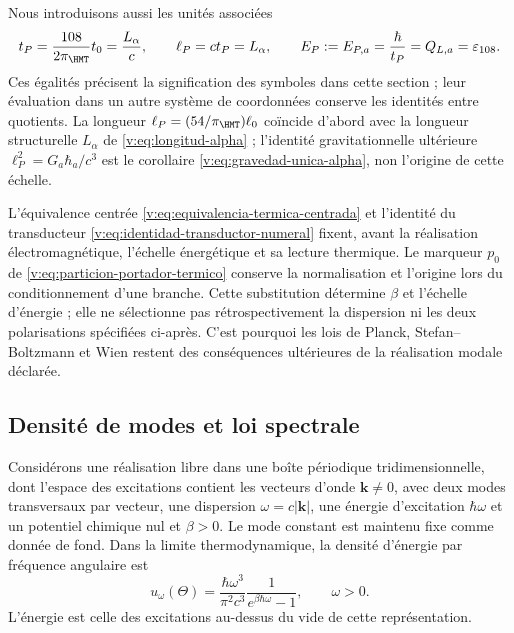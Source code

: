 Nous introduisons aussi les unités associées
\begin{equation}
 t_P=\frac{108}{2\pi_{\HMT}}t_0=\frac{L_\alpha}{c},\qquad
 \ell_P=ct_P=L_\alpha,\qquad
 E_P:=E_{P,a}=\frac{\hbar}{t_P}=Q_{L,a}=\varepsilon_{108}.
 \label{v:eq:unidades-termicas-calendario}
\end{equation}
Ces égalités précisent la signification des symboles dans cette section ;
leur évaluation dans un autre système de coordonnées conserve les identités entre quotients.
La longueur \(\ell_P=(54/\pi_{\HMT})\ell_0\) coïncide d’abord avec
la longueur structurelle \(L_\alpha\) de
\eqref{v:eq:longitud-alpha} ; l’identité gravitationnelle ultérieure
\(\ell_P^2=G_a\hbar_a/c^3\) est le corollaire
\eqref{v:eq:gravedad-unica-alpha}, non l’origine de cette échelle.

L’équivalence centrée
\eqref{v:eq:equivalencia-termica-centrada} et l’identité du transducteur
\eqref{v:eq:identidad-transductor-numeral} fixent, avant la réalisation
électromagnétique, l’échelle énergétique et sa lecture thermique. Le marqueur
$p_0$ de \eqref{v:eq:particion-portador-termico} conserve la normalisation
et l’origine lors du conditionnement d’une branche. Cette substitution détermine $\beta$ et
l’échelle d’énergie ; elle ne sélectionne pas rétrospectivement la dispersion ni
les deux polarisations spécifiées ci-après. C’est pourquoi les
lois de Planck, Stefan--Boltzmann et Wien restent des conséquences
ultérieures de la réalisation modale déclarée.

\subsection{Densité de modes et loi spectrale}

\begin{proposition}
\label{v:prop:ley-espectral}
Considérons une réalisation libre dans une boîte périodique tridimensionnelle,
dont l’espace des excitations contient les vecteurs d’onde
\(\mathbf k\ne0\), avec deux modes transversaux par vecteur, une dispersion
\(\omega=c|\mathbf k|\), une énergie d’excitation \(\hbar\omega\) et
un potentiel chimique nul et \(\beta>0\). Le mode constant est maintenu
fixe comme donnée de fond. Dans la limite thermodynamique, la densité d’énergie
par fréquence angulaire est
\begin{equation}
 u_\omega(\Theta)=\frac{\hbar\omega^3}{\pi^2c^3}
 \frac{1}{e^{\beta\hbar\omega}-1},\qquad \omega>0.
 \label{v:eq:planck-angular}
\end{equation}
L’énergie est celle des excitations au-dessus du vide de cette
représentation.
\end{proposition}

